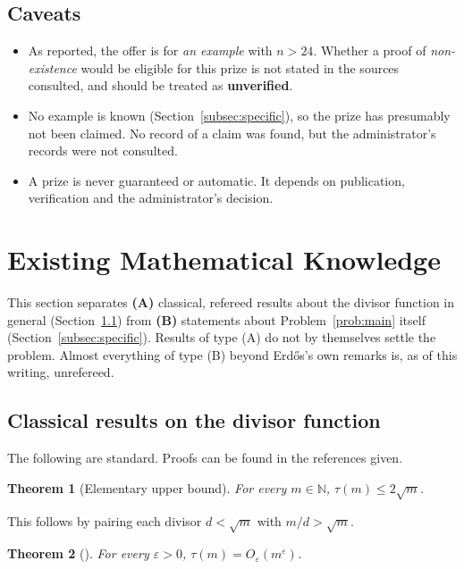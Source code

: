 \documentclass[11pt]{amsart}
\theoremstyle{plain}
\newtheorem{theorem}{Theorem}[section]
\theoremstyle{definition}
\theoremstyle{remark}
\numberwithin{equation}{section}
\newcommand{\N}{\mathbb{N}}
\begin{document}
\subsection{Caveats}
\begin{itemize}
  \item As reported, the offer is for \emph{an example} with $n>24$. Whether a proof of \emph{non-existence} would be eligible for this prize is not stated in the sources consulted, and should be treated as \textbf{unverified}.
  \item No example is known (Section~\ref{subsec:specific}), so the prize has presumably not been claimed. No record of a claim was found, but the administrator's records were not consulted.
  \item A prize is never guaranteed or automatic. It depends on publication, verification and the administrator's decision.
\end{itemize}

\section{Existing Mathematical Knowledge}\label{sec:knowledge}

This section separates \textbf{(A)} classical, refereed results about the divisor function in general (Section~\ref{subsec:classical}) from \textbf{(B)} statements about Problem~\ref{prob:main} itself (Section~\ref{subsec:specific}). Results of type (A) do not by themselves settle the problem. Almost everything of type (B) beyond Erd\H{o}s's own remarks is, as of this writing, unrefereed.

\subsection{Classical results on the divisor function}\label{subsec:classical}

The following are standard. Proofs can be found in the references given.

\begin{theorem}[Elementary upper bound]\label{thm:sqrt}
For every $m\in\N$, $\tau(m)\le 2\sqrt{m}$.
\end{theorem}
This follows by pairing each divisor $d<\sqrt m$ with $m/d>\sqrt m$.

\begin{theorem}[{\cite[Ch.~18]{HardyWright2008}}]\label{thm:epsilon}
For every $\varepsilon>0$, $\tau(m)=O_\varepsilon(m^{\varepsilon})$.
\end{theorem}
\end{document}
